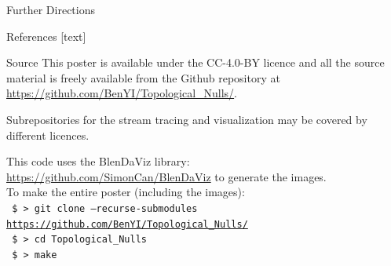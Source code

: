 \documentclass[final]{beamer}
\newlength{\sepwid}
\newlength{\onecolwid}
\begin{document}
\begin{frame}[t]
\begin{columns}[t]
\begin{column}{\onecolwid}
\begin{block}{\huge Further Directions}
\end{block}

\begin{block}{\huge References}
\nocite{*} %
[text]

\vspace{0.75in}
\end{block}

\begin{block}{\huge Source}
This poster is available under the  CC-4.0-BY  licence and all the source material is freely
available from the Github repository at \url{https://github.com/BenYI/Topological_Nulls/}.

Subrepositories for the stream tracing and visualization may be covered by different licences. 

This code uses the BlenDaViz library: \url{https://github.com/SimonCan/BlenDaViz} to generate the images. \\

    To make the entire poster (including the images):\\
\texttt{
	\$ > git clone --recurse-submodules  \url{https://github.com/BenYI/Topological_Nulls/}}\\
\texttt{
    \$ > cd Topological\_Nulls\\
  }
\texttt{
    \$ > make
  }
\vspace{2.2cm}
\begin{figure}
    \centering
\end{figure}
\end{block}
\end{column}

\begin{column}{\sepwid}\end{column} %


\end{columns} %

\end{frame} %
\end{document}
